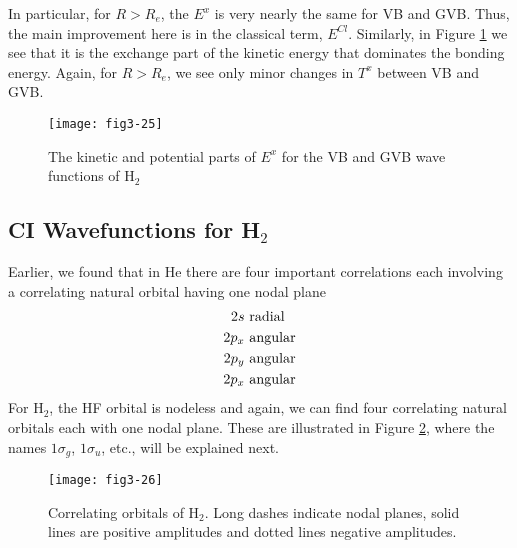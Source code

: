 \noindent
In particular, for $R > R_e$, the $E^x$ is very nearly the same for
VB and GVB.  Thus, the main improvement
here is in the classical term, $E^{Cl}$. Similarly, in Figure
\ref{fig3-26} we see that it is the exchange part of the kinetic
energy that dominates the bonding energy.  Again, for $R > R_e$, we
see only minor changes in $T^x$ between VB and GVB.


\begin{figure}
\texttt{[image: fig3-25]}
\caption{The kinetic and potential parts of $E^x$ for the 
VB and GVB wave functions of H$_2$}
\label{fig3-26}
\end{figure}

\subsection{CI Wavefunctions for H$_2$}

Earlier, we found that in He there are four important correlations each 
involving a correlating natural orbital having one nodal plane
\begin{eqnarray}
2s & ~ {\rm radial}\\
2p_x & ~ {\rm angular}\\
2p_y & ~ {\rm angular}\\
2p_x & ~ {\rm angular}\\
\label{chap3-eqno67}
\end{eqnarray}
For H$_2$, the HF orbital is nodeless and again, we can find
four correlating natural orbitals each with one nodal plane.  These
are illustrated in Figure \ref{fig3-27}, where the names $1 \sigma_g$,
$1 \sigma_u$, etc., will be explained next.

\begin{figure}
\texttt{[image: fig3-26]}
\caption{Correlating orbitals of H$_2$. Long dashes indicate nodal
planes, solid lines are positive  amplitudes and dotted lines negative
amplitudes.} 
\label{fig3-27}
\end{figure}

